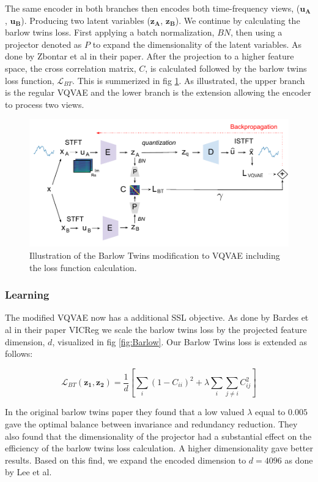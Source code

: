The same encoder in both branches then encodes both time-frequency views, ($\mathbf{u_A}$, $\mathbf{u_B}$). Producing two latent variables ($\mathbf{z_A}$, $\mathbf{z_B}$). We continue by calculating the barlow twins loss. First applying a batch normalization, $BN$, then using a projector denoted as $P$ to expand the dimensionality of the latent variables. As done by Zbontar et al in their paper\cite{Barlow}.
After the projection to a higher feature space, the cross correlation matrix, $C$, is calculated followed by the barlow twins loss function, $\mathcal{L}_{BT}$. This is summerized in fig \ref{fig:BTVQVAE}. 
As illustrated, the upper branch is the regular VQVAE and the lower branch is the extension allowing the encoder to process two views.

\begin{figure}[H]
    \includegraphics[scale=0.8]{figures/figure-pdf/BarlowTwinsVQVAE.pdf}
    \caption{Illustration of the Barlow Twins modification to VQVAE including the loss function calculation.}
    \label{fig:BTVQVAE}
\end{figure}

\subsubsection{Learning}
The modified VQVAE now has a additional SSL objective. As done by Bardes et al in their paper VICReg\cite{VICReg} we scale the barlow twins loss by the projected feature dimension, $d$, visualized in fig \ref{fig:Barlow}. Our Barlow Twins loss is extended as follows:

\begin{equation}
\mathcal{L}_{BT}(\mathbf{z_1}, \mathbf{z_2}) =\frac{1}{d} \left[ \sum_i (1 - C_{ii})^2 + \lambda \sum_i \sum_{j \neq i} C_{ij}^2\right]
\end{equation}

In the original barlow twins paper\cite{Barlow} they found that a low valued $\lambda$ equal to $0.005$ gave the optimal balance between invariance and redundancy reduction. They also found that the dimensionality of the projector had a substantial effect on the 
efficiency of the barlow twins loss calculation. A higher dimensionality gave better results. Based on this find, we expand the encoded dimension to $d=4096$ as done by Lee et al\cite{SSLs}. 

